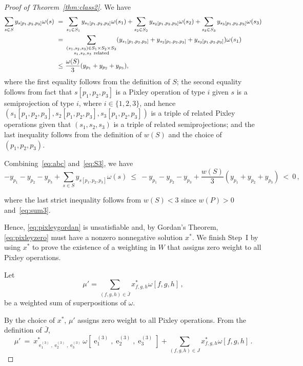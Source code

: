 \documentclass[11pt, reqno]{article}
\DeclareMathOperator{\proj}{\ensuremath{e}}
\newcommand{\tuple}[1]{\ensuremath{(#1)}}
\theoremstyle{remark}
\begin{document}
\begin{proof}[Proof of Theorem~\ref{thm:class2}]
  We have
  \begin{equation}\label{eq:S3}
  \begin{split}
    \sum_{s \in S}y_{s[p_1,p_2,p_3]}\omega(s)\ =\ &
    \sum_{s_1\in S_1}y_{s_1[p_1,p_2,p_3]}\omega(s_1) +
    \sum_{s_2\in S_2}y_{s_2[p_1,p_2,p_3]}\omega(s_2) + \sum_{s_3\in S_3}y_{s_3[p_1,p_2,p_3]}\omega(s_3) \\
    =\ & \sum_{\substack{\tuple{s_1,s_2,s_3}\in S_1\times S_2\times S_3\\s_1,s_2,s_3\mbox{ \scriptsize related}}}(y_{s_1[p_1,p_2,p_3]}+y_{s_2[p_1,p_2,p_3]}+y_{s_3[p_1,p_2,p_3]})\omega(s_1) \\
    \leq\ & \frac{\omega(S)}{3}(y_{p_1}+y_{p_2}+y_{p_3}),\\
  \end{split}
  \end{equation}
  where the first equality follows from the definition of $S$; the second
  equality follows from fact that $s[p_1,p_2,p_3]$ is a Pixley operation of type $i$
  given $s$ is a semiprojection of type $i$, where $i\in\{1,2,3\}$, and hence 
  $\tuple{s_1[p_1,p_2,p_3],s_2[p_1,p_2,p_3],s_3[p_1,p_2,p_3]}$ is a triple of
  related Pixley operations given that $\tuple{s_1,s_2,s_3}$ is a triple of
  related semiprojections;  and the
  last inequality follows from the definition of $w(S)$ and the choice of
  $(p_1,p_2,p_3)$.

  Combining~\eqref{eq:abc} and~\eqref{eq:S3}, we have
  \begin{equation}
  - y_{p_1} - y_{p_2} - y_{p_3} + \sum_{s \in S}y_{s[p_1,p_2,p_3]}\omega(s)
    \ \leq\ 
    - y_{p_1} - y_{p_2} - y_{p_3} + \frac{w(S)}{3}(y_{p_1}+y_{p_2}+y_{p_3})
    \ <\ 0\,,
  \end{equation}

  where the last strict inequality follows from $w(S)<3$ since $w(P)>0$
  and~\eqref{eq:sum3}.

  Hence, \eqref{eq:pixleygordan} is unsatisfiable and, by Gordan's Theorem,
  \eqref{eq:pixleyzero} must have a nonzero nonnegative solution $x^*$. 
  We finish Step~I by using $x^*$ to prove the existence of a
  weighting in $W$ that assigns zero weight to all Pixley operations.
  
  Let
  \begin{equation} \label{eq:result} \mu'=\sum_{(f,g,h) \in \bar{J}}x^*_{f,g,h}\omega[f,g,h]\,, 
  \end{equation}
  be a weighted sum of superpositions of $\omega$. 
  
  By the choice of $x^*$, $\mu'$ assigns zero weight to all Pixley operations. 
  From the definition of $\bar{J}$,
  \begin{equation}\label{eq:mu}
   \mu'\ =\
   x^*_{\proj^{(3)}_1,\proj^{(3)}_2,\proj^{(3)}_3}\omega[\proj^{(3)}_1,\proj^{(3)}_2,\proj^{(3)}_3]+\sum_{(f,g,h)\in
   J}x^*_{f,g,h}\omega[f,g,h]\,.
  \end{equation}


\end{proof}
\end{document}
